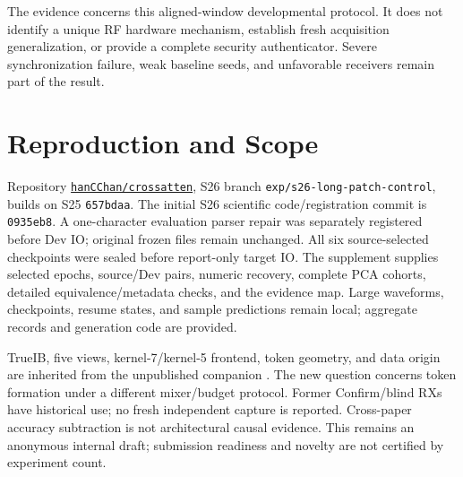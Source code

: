 \documentclass[journal]{IEEEtran}
\begin{document}
The evidence concerns this aligned-window developmental protocol. It does not identify a unique RF hardware mechanism, establish fresh acquisition generalization, or provide a complete security authenticator. Severe synchronization failure, weak baseline seeds, and unfavorable receivers remain part of the result.


\appendices
\section{Reproduction and Scope}
Repository \href{https://github.com/hanCChan/crossatten}{\texttt{hanCChan/crossatten}}, S26 branch \texttt{exp/s26-long-patch-control}, builds on S25 \texttt{657bdaa}. The initial S26 scientific code/registration commit is \texttt{0935eb8}. A one-character evaluation parser repair was separately registered before Dev IO; original frozen files remain unchanged. All six source-selected checkpoints were sealed before report-only target IO. The supplement supplies selected epochs, source/Dev pairs, numeric recovery, complete PCA cohorts, detailed equivalence/metadata checks, and the evidence map. Large waveforms, checkpoints, resume states, and sample predictions remain local; aggregate records and generation code are provided.

TrueIB, five views, kernel-7/kernel-5 frontend, token geometry, and data origin are inherited from the unpublished companion \cite{oobcompanion}. The new question concerns token formation under a different mixer/budget protocol. Former Confirm/blind RXs have historical use; no fresh independent capture is reported. Cross-paper accuracy subtraction is not architectural causal evidence. This remains an anonymous internal draft; submission readiness and novelty are not certified by experiment count.
\balance


\end{document}
